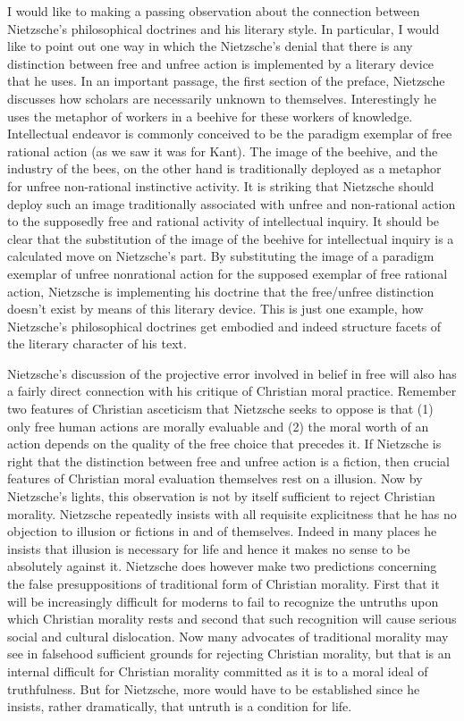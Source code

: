 I would like to making a passing observation about the connection between Nietzsche's philosophical doctrines and his literary style. In particular, I would like to point out one way in which the Nietzsche's denial that there is any distinction between free and unfree action is implemented by a literary device that he uses. In an important passage, the first section of the preface, Nietzsche discusses how scholars are necessarily unknown to themselves. Interestingly he uses the metaphor of workers in a beehive for these workers of knowledge. Intellectual endeavor is commonly conceived to be the paradigm exemplar of free rational action (as we saw it was for Kant). The image of the beehive, and the industry of the bees, on the other hand is traditionally deployed as a metaphor for unfree non-rational instinctive activity. It is striking that Nietzsche should deploy such an image traditionally associated with unfree and non-rational action to the supposedly free and rational activity of intellectual inquiry. It should be clear that the substitution of the image of the beehive for intellectual inquiry is a calculated move on Nietzsche's part. By substituting the image of a paradigm exemplar of unfree nonrational action for the supposed exemplar of free rational action, Nietzsche is implementing his doctrine that the free/unfree distinction doesn't exist by means of this literary device. This is just one example, how Nietzsche's philosophical doctrines get embodied and indeed structure facets of the literary character of his text.

Nietzsche's discussion of the projective error involved in belief in free will also has a fairly direct connection with his critique of Christian moral practice. Remember two features of Christian asceticism that Nietzsche seeks to oppose is that (1) only free human actions are morally evaluable and (2) the moral worth of an action depends on the quality of the free choice that precedes it. If Nietzsche is right that the distinction between free and unfree action is a fiction, then crucial features of Christian moral evaluation themselves rest on a illusion. Now by Nietzsche's lights, this observation is not by itself sufficient to reject Christian morality. Nietzsche repeatedly insists with all requisite explicitness that he has no objection to illusion or fictions in and of themselves. Indeed in many places he insists that illusion is necessary for life and hence it makes no sense to be absolutely against it. Nietzsche does however make two predictions concerning the false presuppositions of traditional form of Christian morality. First that it will be increasingly difficult for moderns to fail to recognize the untruths upon which Christian morality rests and second that such recognition will cause serious social and cultural dislocation. Now many advocates of traditional morality may see in falsehood sufficient grounds for rejecting Christian morality, but that is an internal difficult for Christian morality committed as it is to a moral ideal of truthfulness. But for Nietzsche, more would have to be established since he insists, rather dramatically, that untruth is a condition for life. 

